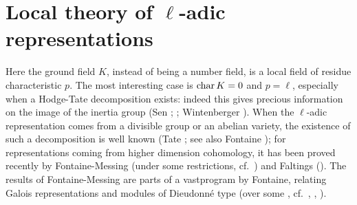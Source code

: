 \section*{Local theory of \texorpdfstring{$\ell$}{ℓ}-adic representations}
Here the ground field $K$, instead of being a number field, is a local field of
residue characteristic $p$. The most interesting case is $\operatorname{char} K = 0$ and $p =
\ell$, especially when a Hodge-Tate decomposition exists: indeed this gives
precious information on the image of the inertia group (Sen \cite{72};
\cite{79}; Wintenberger \cite{85}). When the $\ell$-adic representation comes
from a divisible group or an abelian variety, the existence of such a
decomposition is well known (Tate \cite{39}; see also Fontaine \cite{60}); for
representations coming from higher dimension cohomology, it has been proved
recently by Fontaine-Messing (under some restrictions, cf.\ \cite{62}) and
Faltings (\cite{55}). The results of Fontaine-Messing are parts of a
vastprogram by Fontaine, relating Galois representations and modules of
Dieudonné type (over some , cf.\ \cite{58},
\cite{59}, \cite{61}).
